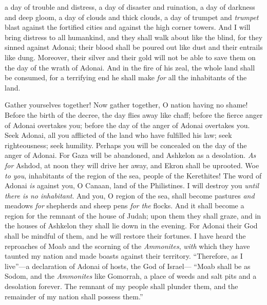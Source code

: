 \begin{biblechapter}
a day of trouble and distress, 
a day of disaster and ruination, 
a day of darkness and deep gloom, 
a day of clouds and thick clouds,
\verse a day of trumpet and \textit{trumpet} blast 
against the fortified cities 
and against the high corner towers.
\verse And I will bring distress to all humankind, 
and they shall walk about like the blind, 
for they sinned against Adonai; 
their blood shall be poured out like dust 
and their entrails like dung.
\verse Moreover, their silver and their gold 
will not be able to save them 
on the day of the wrath of Adonai. 
And in the fire of his zeal, 
the whole land shall be consumed, 
for a terrifying end he shall make 
\textit{for} all the inhabitants of the land.
\end{biblechapter}

\begin{biblechapter} %
 Gather yourselves together! Now gather together, 
O nation having no shame!
\verse Before the birth of the decree, 
the day flies away like chaff; 
before the fierce anger of Adonai overtakes you; 
before the day of the anger of Adonai overtakes you.
\verse Seek Adonai, all you afflicted of the land 
who have fulfilled his law; 
seek righteousness; 
seek humility. 
Perhaps you will be concealed 
on the day of the anger of Adonai.
\verse For Gaza will be abandoned, 
and Ashkelon as a desolation. 
\textit{As for} Ashdod, at noon they will drive her away, 
and Ekron shall be uprooted.
\verse Woe \textit{to you}, inhabitants of the region of the sea, 
people of the Kerethites! 
The word of Adonai \textit{is} against you, 
O Canaan, land of the Philistines. 
I will destroy you \textit{until there is no inhabitant}.
\verse And you, O region of the sea, shall become 
pastures \textit{and} meadows \textit{for} shepherds 
and sheep pens \textit{for the} flocks.
\verse And it shall become a region 
for the remnant of the house of Judah; 
upon them they shall graze, 
and in the houses of Ashkelon 
they shall lie down in the evening. 
For Adonai their God shall be mindful of them, 
and he will restore their fortunes.
\verse I have heard the reproaches of Moab 
and the scorning of the \textit{Ammonites}, 
\textit{with} which they have taunted my nation 
and made boasts against their territory.
\verse “Therefore, as I live”—a declaration of Adonai of hosts, 
the God of Israel— 
“Moab shall be as Sodom, 
and the \textit{Ammonites} like Gomorrah, 
a place of weeds and salt pits 
and a desolation forever. 
The remnant of my people shall plunder them, 
and the remainder of my nation shall possess them.”

\end{biblechapter}

